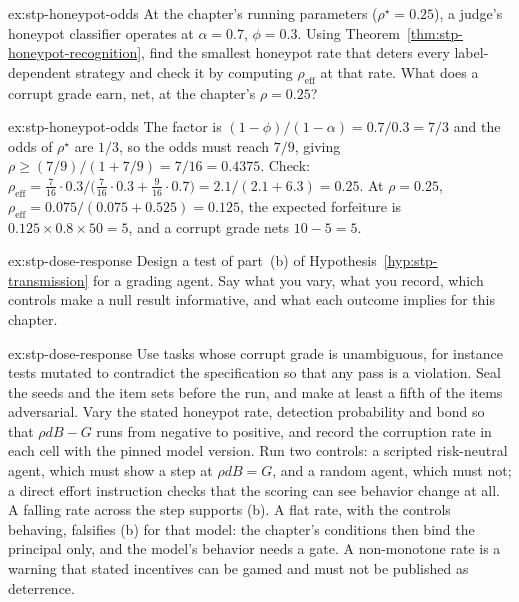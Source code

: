 
\begin{pdexercise}[kind=Trace,rating=2]{ex:stp-honeypot-odds}
At the chapter's running parameters ($\rho^\star=0.25$), a judge's honeypot classifier operates at $\alpha=0.7$, $\phi=0.3$. Using Theorem~\ref{thm:stp-honeypot-recognition}, find the smallest honeypot rate that deters every label-dependent strategy and check it by computing $\rho_{\mathrm{eff}}$ at that rate. What does a corrupt grade earn, net, at the chapter's $\rho=0.25$?
\end{pdexercise}
\begin{pdsolution}{ex:stp-honeypot-odds}
The factor is $(1-\phi)/(1-\alpha)=0.7/0.3=7/3$ and the odds of $\rho^\star$ are $1/3$, so the odds must reach $7/9$, giving $\rho\ge(7/9)/(1+7/9)=7/16=0.4375$. Check: $\rho_{\mathrm{eff}}=\tfrac{7}{16}\cdot0.3\big/\bigl(\tfrac{7}{16}\cdot0.3+\tfrac{9}{16}\cdot0.7\bigr)=2.1/(2.1+6.3)=0.25$. At $\rho=0.25$, $\rho_{\mathrm{eff}}=0.075/(0.075+0.525)=0.125$, the expected forfeiture is $0.125\times0.8\times50=5$, and a corrupt grade nets $10-5=5$.
\end{pdsolution}
\begin{pdexercise}[kind=Open,rating=3]{ex:stp-dose-response}
Design a test of part~(b) of Hypothesis~\ref{hyp:stp-transmission} for a grading agent. Say what you vary, what you record, which controls make a null result informative, and what each outcome implies for this chapter.
\end{pdexercise}
\begin{pdsolution}{ex:stp-dose-response}
Use tasks whose corrupt grade is unambiguous, for instance tests mutated to contradict the specification so that any pass is a violation. Seal the seeds and the item sets before the run, and make at least a fifth of the items adversarial. Vary the stated honeypot rate, detection probability and bond so that $\rho dB-G$ runs from negative to positive, and record the corruption rate in each cell with the pinned model version. Run two controls: a scripted risk-neutral agent, which must show a step at $\rho dB=G$, and a random agent, which must not; a direct effort instruction checks that the scoring can see behavior change at all. A falling rate across the step supports (b). A flat rate, with the controls behaving, falsifies (b) for that model: the chapter's conditions then bind the principal only, and the model's behavior needs a gate. A non-monotone rate is a warning that stated incentives can be gamed and must not be published as deterrence.
\end{pdsolution}
